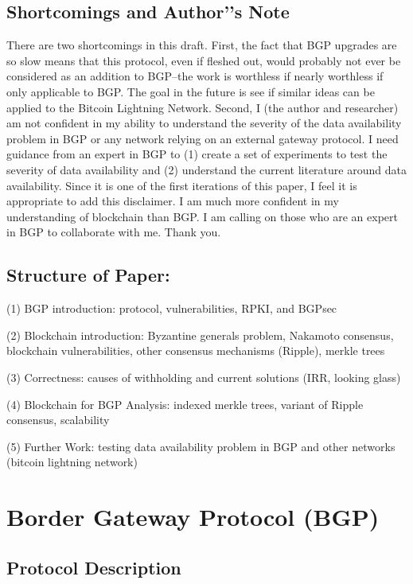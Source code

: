 \documentclass[letterpaper, 10 pt, conference]{ieeeconf}  %
\begin{document}
\subsection{Shortcomings and Author’'s Note}

There are two shortcomings in this draft. First, the fact that BGP upgrades are so slow means that this protocol, even if fleshed out, would probably not ever be considered as an addition to BGP--the work is worthless if nearly worthless if only applicable to BGP. The goal in the future is see if similar ideas can be applied to the Bitcoin Lightning Network. Second, I (the author and researcher) am not confident in my ability to understand the severity of the data availability problem in BGP or any network relying on an external gateway protocol. I need guidance from an expert in BGP to (1) create a set of experiments to test the severity of data availability and (2) understand the current literature around data availability. Since it is one of the first iterations of this paper, I feel it is appropriate to add this disclaimer. I am much more confident in my understanding of blockchain than BGP. I am calling on those who are an expert in BGP to collaborate with me. Thank you.  


\subsection{Structure of Paper:
}

(1) BGP introduction: protocol, vulnerabilities, RPKI, and BGPsec

(2) Blockchain introduction: Byzantine generals problem, Nakamoto consensus, blockchain vulnerabilities, other consensus mechanisms (Ripple), merkle trees

(3) Correctness: causes of withholding and current solutions (IRR, looking glass)

(4) Blockchain for BGP Analysis: indexed merkle trees, variant of Ripple consensus, scalability

(5) Further Work: testing data availability problem in BGP and other networks (bitcoin lightning network)


\section{Border Gateway Protocol (BGP)}

\subsection{Protocol Description}
\end{document}
